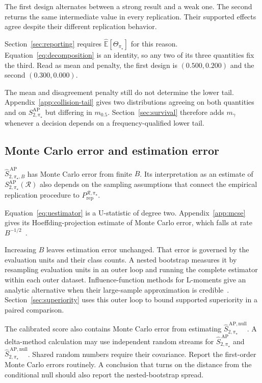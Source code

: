 \documentclass[11pt]{article}
\newcommand{\Regime}{\mathcal{R}}
\newcommand{\E}{\mathbb{E}}
\newcommand{\SAPfull}{S_{2,\pi_\star}^{\mathrm{AP}}(\Regime)}
\newcommand{\SAP}{S_{2,\pi_\star}^{\mathrm{AP}}}
\newcommand{\SAPHat}{\widehat S_{2,\pi_\star}^{\,\mathrm{AP}}}
\newcommand{\SAPHatB}{\widehat S_{2,\pi_\star,B}^{\,\mathrm{AP}}}
\newcommand{\SAPnullHat}{\widehat S_{2,\pi_\star}^{\,\mathrm{AP,null}}}
\newcommand{\PRep}{P_{\mathrm{rep}}^{\Regime,\pi_\star}}
\theoremstyle{remark}
\begin{document}
The first design alternates between a strong result and a weak one. The second returns the same intermediate value in every replication. Their supported effects agree despite their different replication behavior.

Section~\ref{sec:reporting} requires $\widehat{\E}[\Theta_{\pi_\star}]$ for this reason. Equation~\eqref{eq:decomposition} is an identity, so any two of its three quantities fix the third. Read as mean and penalty, the first design is $(0.500,0.200)$ and the second $(0.300,0.000)$.

The mean and disagreement penalty still do not determine the lower tail. Appendix~\ref{app:collision-tail} gives two distributions agreeing on both quantities and on $\SAP$ but differing in $m_{0.5}$. Section~\ref{sec:survival} therefore adds $m_\gamma$ whenever a decision depends on a frequency-qualified lower tail.

\subsection{Monte Carlo error and estimation error}
\label{sec:error}

$\SAPHatB$ has Monte Carlo error from finite $B$. Its interpretation as an estimate of $\SAPfull$ also depends on the sampling assumptions that connect the empirical replication procedure to $\PRep$.

Equation~\eqref{eq:uestimator} is a U-statistic of degree two. Appendix~\ref{app:mcse} gives its Hoeffding-projection estimate of Monte Carlo error, which falls at rate $B^{-1/2}$~\cite{hoeffding1948ustat}.

Increasing $B$ leaves estimation error unchanged. That error is governed by the evaluation units and their class counts. A nested bootstrap measures it by resampling evaluation units in an outer loop and running the complete estimator within each outer dataset. Influence-function methods for L-moments give an analytic alternative when their large-sample approximation is credible~\cite{hosking1990lmoments}. Section~\ref{sec:superiority} uses this outer loop to bound supported superiority in a paired comparison.

The calibrated score also contains Monte Carlo error from estimating $\SAPnullHat$. A delta-method calculation may use independent random streams for $\SAPHat$ and $\SAPnullHat$. Shared random numbers require their covariance. Report the first-order Monte Carlo errors routinely. A conclusion that turns on the distance from the conditional null should also report the nested-bootstrap spread.
\end{document}
